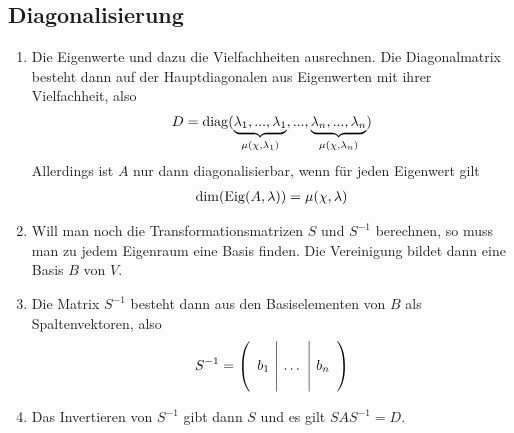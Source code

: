 \documentclass[ngerman,a4paper]{article}
\DeclareMathOperator{\Eig}{Eig}
\DeclareMathOperator{\diag}{diag}
\begin{document}
\subsection{Diagonalisierung}
\begin{enumerate}[label=\textbf{\arabic*.}]
	\item Die Eigenwerte und dazu die Vielfachheiten ausrechnen. Die Diagonalmatrix besteht dann auf der Hauptdiagonalen aus Eigenwerten mit ihrer Vielfachheit, also
	\begin{align}
		D = \diag(\underbrace{\lambda_1, ..., \lambda_1}_{\mu(\chi,\lambda_1)}, ..., \underbrace{\lambda_n, ..., \lambda_n}_{\mu(\chi,\lambda_n)})\notag
	\end{align}
	Allerdings ist $A$ nur dann diagonalisierbar, wenn für jeden Eigenwert gilt
	\begin{align}
		\dim(\Eig(A,\lambda)) = \mu(\chi,\lambda)\notag
	\end{align}
	\item Will man noch die Transformationsmatrizen $S$ und $S^{-1}$ berechnen, so muss man zu jedem Eigenraum eine Basis finden. Die Vereinigung bildet dann eine Basis $B$ von $V$.
	\item Die Matrix $S^{-1}$ besteht dann aus den Basiselementen von $B$ als Spaltenvektoren, also
	\begin{align}
		S^{-1} = \left(\begin{array}{c|c|c}
		&& \\
		b_1 & \dots & b_n \\
		&&
		\end{array}\right)\notag
	\end{align}
	\item Das Invertieren von $S^{-1}$ gibt dann $S$ und es gilt $SAS^{-1}=D$.
\end{enumerate}
\end{document}
